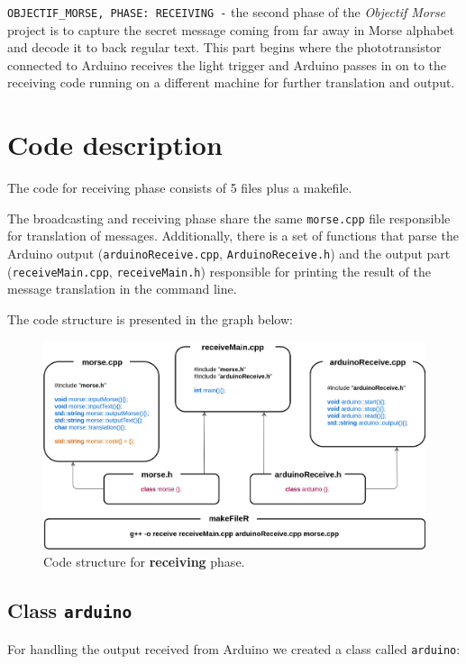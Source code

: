 \documentclass[12pt]{report}
\begin{document}
\verb|OBJECTIF_MORSE, PHASE: RECEIVING -| the second phase of the \textit{Objectif Morse} project is to capture the secret message coming from far away in Morse alphabet and decode it to back regular text. This part begins where the phototransistor connected to Arduino receives the light trigger and Arduino passes in on to the receiving code running on a different machine for further translation and output.

\newpage

\section{Code description}

The code for receiving phase consists of 5 files plus a makefile. 

The broadcasting and receiving phase share the same \verb|morse.cpp| file responsible for translation of messages. Additionally, there is a set of functions that parse the Arduino output (\verb|arduinoReceive.cpp|, \verb|ArduinoReceive.h|) and the output part (\verb|receiveMain.cpp|, \verb|receiveMain.h|) responsible for printing the result of the message translation in the command line.

The code structure is presented in the graph below:

\begin{figure}[H]
\centering\includegraphics[width=14.5cm]{rCodeStructure}
\caption{Code structure for \textbf{receiving} phase.}	
\label{fig:re_code}
\end{figure}


\subsection{Class \texttt{arduino}}

For handling the output received from Arduino we created a class called \verb|arduino|:
\end{document}
